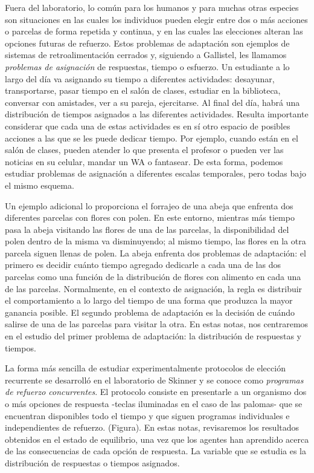 \documentclass[
  letterpaper,
]{book}
\begin{document}
Fuera del laboratorio, lo común para los humanos y para muchas otras
especies son situaciones en las cuales los individuos pueden elegir
entre dos o más acciones o parcelas de forma repetida y continua, y en
las cuales las elecciones alteran las opciones futuras de refuerzo.
Estos problemas de adaptación son ejemplos de sistemas de
retroalimentación cerrados y, siguiendo a Gallistel, les llamamos
\emph{problemas de asignación} de respuestas, tiempo o esfuerzo. Un
estudiante a lo largo del día va asignando su tiempo a diferentes
actividades: desayunar, transportarse, pasar tiempo en el salón de
clases, estudiar en la biblioteca, conversar con amistades, ver a su
pareja, ejercitarse. Al final del día, habrá una distribución de tiempos
asignados a las diferentes actividades. Resulta importante considerar
que cada una de estas actividades es en sí otro espacio de posibles
acciones a las que se les puede dedicar tiempo. Por ejemplo, cuando
están en el salón de clases, pueden atender lo que presenta el profesor
o pueden ver las noticias en su celular, mandar un WA o fantasear. De
esta forma, podemos estudiar problemas de asignación a diferentes
escalas temporales, pero todas bajo el mismo esquema.

Un ejemplo adicional lo proporciona el forrajeo de una abeja que
enfrenta dos diferentes parcelas con flores con polen. En este entorno,
mientras más tiempo pasa la abeja visitando las flores de una de las
parcelas, la disponibilidad del polen dentro de la misma va
disminuyendo; al mismo tiempo, las flores en la otra parcela siguen
llenas de polen. La abeja enfrenta dos problemas de adaptación: el
primero es decidir cuánto tiempo agregado dedicarle a cada una de las
dos parcelas como una función de la distribución de flores con alimento
en cada una de las parcelas. Normalmente, en el contexto de asignación,
la regla es distribuir el comportamiento a lo largo del tiempo de una
forma que produzca la mayor ganancia posible. El segundo problema de
adaptación es la decisión de cuándo salirse de una de las parcelas para
visitar la otra. En estas notas, nos centraremos en el estudio del
primer problema de adaptación: la distribución de respuestas y tiempos.

La forma más sencilla de estudiar experimentalmente protocolos de
elección recurrente se desarrolló en el laboratorio de Skinner y se
conoce como \emph{programas de refuerzo concurrentes}. El protocolo
consiste en presentarle a un organismo dos o más opciones de respuesta
-teclas iluminadas en el caso de las palomas- que se encuentran
disponibles todo el tiempo y que siguen programas individuales e
independientes de refuerzo. (Figura). En estas notas, revisaremos los
resultados obtenidos en el estado de equilibrio, una vez que los agentes
han aprendido acerca de las consecuencias de cada opción de respuesta.
La variable que se estudia es la distribución de respuestas o tiempos
asignados.
\end{document}
